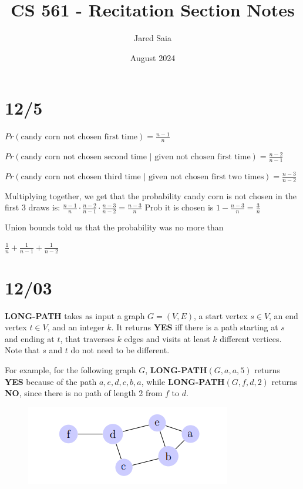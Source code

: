 \documentclass{article}
\title{CS 561 - Recitation Section Notes}
\author{Jared Saia}
\date{August 2024}
\begin{document}
\maketitle

\section{12/5}

$Pr(\textrm{candy corn not chosen first time}) = \frac{n-1}{n}$

$Pr(\textrm{candy corn not chosen second time | given not chosen first time}) = \frac{n-2}{n-1}$

$Pr(\textrm{candy corn not chosen third time | given not chosen first two times}) = \frac{n-3}{n-2}$

Multiplying together, we get that the probability candy corn is not chosen in the first $3$ draws is:
$\frac{n-1}{n} \cdot \frac{n-2}{n-1} \cdot \frac{n-3}{n-2} = \frac{n-3}{n}$
Prob it is chosen is
$1 - \frac{n-3}{n} = \frac{3}{n}$

Union bounds told us that the probability was no more than

$\frac{1}{n} + \frac{1}{n-1} + \frac{1}{n-2}$


\section{12/03}


\textbf{LONG-PATH} takes as input a graph \( G = (V, E) \), a start vertex \( s \in V \),
an end vertex \( t \in V \), and an integer \( k \). It returns \textbf{YES} iff there is a path
starting at \( s \) and ending at \( t \), that traverses \( k \) edges and visits at least \( k \)
different vertices. Note that \( s \) and \( t \) do not need to be different.

For example, for the following graph \( G \), \textbf{LONG-PATH}\((G, a, a, 5)\) returns
\textbf{YES} because of the path \( a, e, d, c, b, a \), while \textbf{LONG-PATH}\((G, f, d, 2)\) returns \textbf{NO}, since there is no path of length 2 from \( f \) to \( d \).


\begin{figure}[H]
    \centering
    \includegraphics[width=0.5\linewidth]{Screenshot from 2024-12-03 11-29-17.png}
    \caption{}
    \label{fig:Problem 3}
\end{figure}
\end{document}
